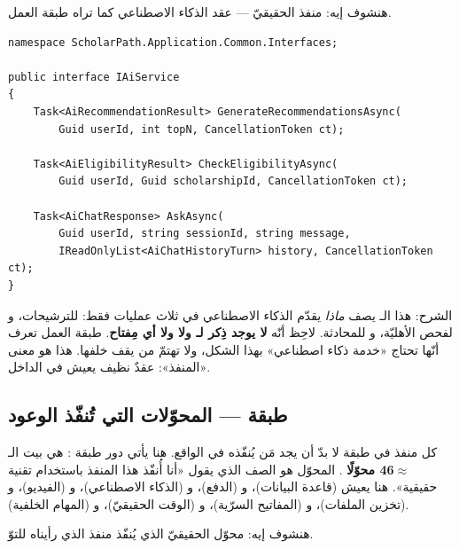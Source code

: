 هنشوف إيه: منفذ  الحقيقيّ — عقد الذكاء الاصطناعي كما تراه طبقة العمل.

\begin{english}
\begin{lstlisting}[language={[Sharp]C}]
namespace ScholarPath.Application.Common.Interfaces;

public interface IAiService
{
    Task<AiRecommendationResult> GenerateRecommendationsAsync(
        Guid userId, int topN, CancellationToken ct);

    Task<AiEligibilityResult> CheckEligibilityAsync(
        Guid userId, Guid scholarshipId, CancellationToken ct);

    Task<AiChatResponse> AskAsync(
        Guid userId, string sessionId, string message,
        IReadOnlyList<AiChatHistoryTurn> history, CancellationToken ct);
}
\end{lstlisting}
\end{english}

الشرح: هذا الـ  يصف \emph{ماذا} يقدّم الذكاء الاصطناعي في ثلاث
عمليات فقط:  للترشيحات،
و لفحص الأهليّة، و للمحادثة. لاحِظ أنّه
\textbf{لا يوجد ذِكر لـ  ولا  ولا أي مِفتاح}. طبقة العمل تعرف
أنّها تحتاج «خدمة ذكاء اصطناعي» بهذا الشكل، ولا تهتمّ من يقف خلفها. هذا هو معنى
«المنفذ»: عقدٌ نظيف يعيش في الداخل.

\subsection{طبقة  — المحوّلات التي تُنفّذ الوعود}

كل منفذ في طبقة  لا بدّ أن يجد مَن يُنفّذه في الواقع. هنا يأتي دور
طبقة : هي بيت الـ \textbf{$\approx$46 محوّلًا} .
المحوّل هو الصف  الذي يقول «أنا أُنفّذ هذا المنفذ باستخدام تقنية
حقيقية». هنا يعيش  (قاعدة البيانات)، و (الدفع)، و (الذكاء الاصطناعي)، و (الفيديو)، و (تخزين الملفات)،
و (المفاتيح السرّية)، و (الوقت الحقيقيّ)، و
(المهام الخلفية).

هنشوف إيه: محوّل  الحقيقيّ الذي يُنفّذ منفذ 
الذي رأيناه للتوّ.

